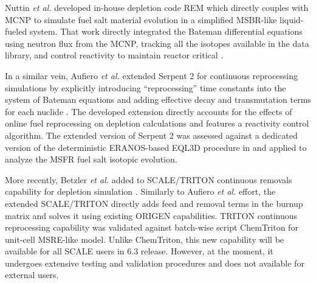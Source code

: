 Nuttin \emph{et al.} developed in-house depletion code REM which directly 
couples with \gls{MCNP} \cite{werner_mcnp_2017-1} to simulate fuel salt 
material evolution in a simplified \gls{MSBR}-like liquid-fueled system. That 
work directly integrated the Bateman differential equations using neutron flux 
from the \gls{MCNP}, tracking all the isotopes available in the data library, 
and control reactivity to maintain reactor critical  
\cite{nuttin_potential_2005}.

In a similar vein, Aufiero \emph{et al.} extended Serpent 2 for continuous 
reprocessing simulations by explicitly introducing ``reprocessing'' time 
constants into the system of Bateman equations and adding effective decay and 
transmutation terms for each nuclide \cite{aufiero_extended_2013}. The 
developed extension directly accounts for the effects of online fuel 
reprocessing on depletion calculations and features a reactivity control 
algorithm. The extended version of Serpent 2 was assessed against a dedicated 
version of the deterministic ERANOS-based EQL3D procedure in 
\cite{fiorina_investigation_2013} and applied to analyze the \gls{MSFR} fuel 
salt isotopic evolution.

More recently, Betzler \emph{et al.} added to SCALE/TRITON continuous removals 
capability for depletion simulation \cite{betzler_molten_2019}. Similarly to 
Aufiero \emph{et al.} effort, the extended SCALE/TRITON directly adds feed and 
removal terms in the burnup matrix and solves it using existing ORIGEN 
capabilities. TRITON continuous reprocessing capability was validated against 
batch-wise script ChemTriton for unit-cell \gls{MSRE}-like model. Unlike 
ChemTriton, this new capability will be available for all SCALE users in 6.3 
release. However, at the moment, it undergoes extensive testing and validation 
procedures and does not available for external users.

